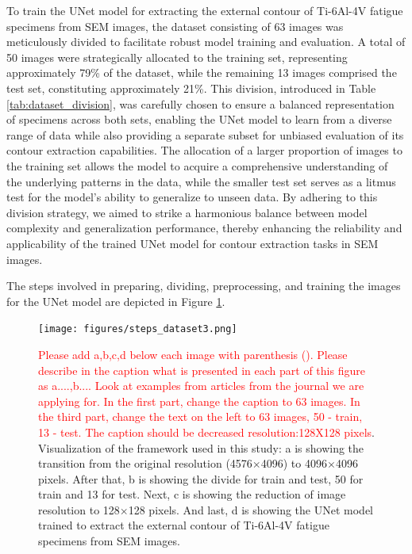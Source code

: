\documentclass[preprint,12pt]{elsarticle}
\begin{document}
To train the UNet model for extracting the external contour of Ti-6Al-4V fatigue specimens from SEM images, the dataset consisting of 63 images was meticulously divided to facilitate robust model training and evaluation. A total of 50 images were strategically allocated to the training set, representing approximately 79\% of the dataset, while the remaining 13 images comprised the test set, constituting approximately 21\%. This division, introduced in Table \ref{tab:dataset_division}, was carefully chosen to ensure a balanced representation of specimens across both sets, enabling the UNet model to learn from a diverse range of data while also providing a separate subset for unbiased evaluation of its contour extraction capabilities. The allocation of a larger proportion of images to the training set allows the model to acquire a comprehensive understanding of the underlying patterns in the data, while the smaller test set serves as a litmus test for the model's ability to generalize to unseen data. By adhering to this division strategy, we aimed to strike a harmonious balance between model complexity and generalization performance, thereby enhancing the reliability and applicability of the trained UNet model for contour extraction tasks in SEM images.

The steps involved in preparing, dividing, preprocessing, and training the images for the UNet model are depicted in Figure \ref{steps_was_done}.




\begin{figure}[t!]
  \centering
  \texttt{[image: figures/steps\_dataset3.png]}
  \caption{\textcolor{red}{Please add a,b,c,d below each image with parenthesis (). Please describe in the caption what is presented in each part of this figure as a....,b.... Look at examples from articles from the journal we are applying for. In the first part, change the caption to 63 images. In the third part, change the text on the left to 63 images, 50 - train, 13 - test. The caption should be decreased resolution:128X128 pixels}. Visualization of the framework used in this study: a is showing the transition from the original resolution (4576$\times$4096) to 4096$\times$4096 pixels. After that, b is showing the divide for train and test, 50 for train and 13 for test. Next, c is showing the reduction of image resolution to 128$\times$128 pixels. And last, d is showing the UNet model trained to extract the external contour of Ti-6Al-4V fatigue specimens from SEM images.}
  \label{steps_was_done}
\end{figure}
\end{document}
